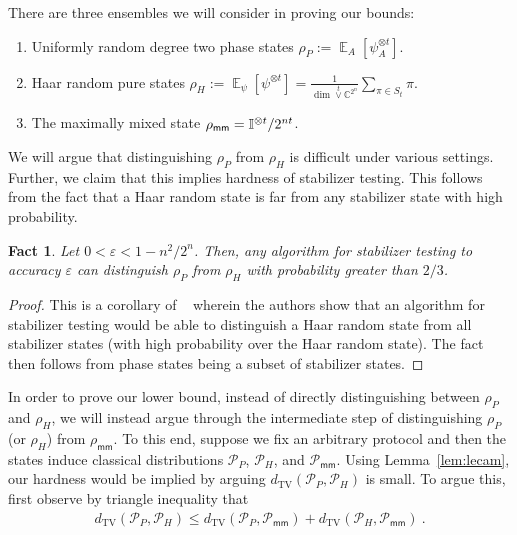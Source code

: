 \documentclass[11pt]{article}
\newtheorem{fact}[theorem]{Fact}
\newcommand{\E}{\mathop{\mathbb{E}}}
\newcommand{\eps}{\varepsilon}
\newcommand{\id}{\ensuremath{\mathbb{I}}}
\newcommand{\TV}{d_{\text{TV}}}
\begin{document}
There are three ensembles we will consider in proving our bounds:
\begin{enumerate}
    \item Uniformly random degree two phase states $\rho_P := \E_{A}[\psi_A^{\otimes t}]$.
    \item Haar random pure states $\rho_H := \E_\psi[\psi^{\otimes t}] = \frac{1}{\dim \overset{t}{\vee}\mathbb{C}^{2^n}}\sum_{\pi \in S_t} \pi$.
    \item The maximally mixed state $\rho_{\textsf{\textsf{mm}}} = \id^{\otimes t}/2^{nt}$.
\end{enumerate}

We will argue that distinguishing $\rho_P$ from $\rho_H$ is difficult under various settings. Further, we claim that this implies hardness of stabilizer testing. This follows from the fact that a Haar random state is far from any stabilizer state with high probability.
\begin{fact}
    Let $0 < \eps < 1-n^2/2^n$. Then, any algorithm for stabilizer testing to accuracy $\eps$ can distinguish $\rho_P$ from $\rho_H$ with probability greater than $2/3$.
\end{fact}
\begin{proof}
    This is a corollary of ~\cite[Lemma~4.3,4.4]{hinsche2025single} wherein the authors show that an algorithm for stabilizer testing would be able to distinguish a Haar random state from all stabilizer states (with high probability over the Haar random state). The fact then follows from phase states being a subset of stabilizer states.
\end{proof}
In order to prove our lower bound, instead of directly distinguishing between $\rho_P$ and $\rho_H$, we will instead argue through the intermediate step of distinguishing $\rho_P$ (or $\rho_H$) from $\rho_{\textsf{mm}}$. To this end, suppose we fix an arbitrary protocol and then the states induce classical distributions $\mathcal{P}_{P}$, $\mathcal{P}_H$, and $\mathcal{P}_{\textsf{mm}}$. Using Lemma~\ref{lem:lecam}, our hardness would be implied by arguing $\TV(\mathcal{P}_P, \mathcal{P}_H)$ is small. To argue this, first observe by  triangle inequality that
\begin{align}
    \TV(\mathcal{P}_P, \mathcal{P}_H) \leq \TV(\mathcal{P}_P, \mathcal{P}_{\textsf{mm}}) + \TV(\mathcal{P}_H, \mathcal{P}_{\textsf{mm}})\ .
\end{align}
\end{document}
